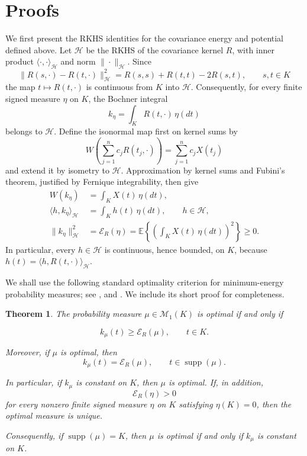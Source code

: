 \documentclass[11pt]{amsart}
\newtheorem{theorem}{Theorem}[section]
\theoremstyle{definition}
\theoremstyle{remark}
\providecommand{\supp}{\operatorname{supp}}
\newcommand{\Ee}{\mathbb E}
\newcommand{\cH}{\mathcal H}
\newcommand{\cM}{\mathcal M_1}
\begin{document}
\section{Proofs}
\label{sec:proofs}
We first present the RKHS identities for the covariance energy and
potential defined above.  Let $\cH$ be the RKHS of the covariance kernel
$R$, with inner product $\langle\cdot,\cdot\rangle_{\cH}$ and norm
$\|\cdot\|_{\cH}$.  Since
\[
 \|R(s,\cdot)-R(t,\cdot)\|_{\cH}^2
 =R(s,s)+R(t,t)-2R(s,t), \qquad s,t \in K
\]
the map $t\mapsto R(t,\cdot)$ is continuous from $K$ into $\cH$.
Consequently, for every finite signed measure $\eta$ on $K$, the
Bochner integral
\[
 k_\eta=\int_KR(t,\cdot)\,\eta(dt)
\]
belongs to $\cH$.  Define the isonormal map first on kernel sums by
\[
 W\left(\sum_{j=1}^nc_jR(t_j,\cdot)\right)
 =\sum_{j=1}^nc_jX(t_j)
\]
and extend it by isometry to $\cH$.  Approximation by kernel sums and
Fubini's theorem, justified by Fernique integrability, then give
\begin{equation}
 \begin{split}
 W(k_\eta)&=\int_KX(t)\,\eta(dt),\\
 \langle h,k_\eta\rangle_{\cH}&=\int_Kh(t)\,\eta(dt),\qquad h\in\cH,\\
 \|k_\eta\|_{\cH}^2
 &=\mathcal E_R(\eta)
 =\Ee\left\{\left(\int_KX(t)\,\eta(dt)\right)^2\right\}\geq0.
 \end{split}
 \label{eq:rkhs-measure-identities}
\end{equation}
In particular, every $h\in\cH$ is continuous, hence bounded, on $K$,
because $h(t)=\langle h,R(t,\cdot)\rangle_{\cH}$.

We shall use the following standard optimality criterion for minimum-energy
probability measures; see   \cite[Theorem~4.3]{adler2014existence}, \cite[Theorem~2.1]{selk2024large} and
\cite[Theorem~1.1]{pronzato2021minimum}.  We include its short proof for
completeness.

\begin{theorem}
\label{thm:optimal-measure-criterion} The probability measure
\(\mu\in\cM(K)\) is optimal
if and only if

\[
        k_\mu(t)\ge \mathcal E_R(\mu),
        \qquad t\in K.
\]

Moreover, if \(\mu\) is optimal, then
\[
        k_\mu(t)=\mathcal E_R(\mu),
        \qquad t\in\supp(\mu).
\]

In particular, if \(k_\mu\) is constant on \(K\), then \(\mu\) is
optimal. If, in addition,
\[
        \mathcal E_R(\eta)>0
\]
for every nonzero finite signed measure \(\eta\) on \(K\) satisfying
\(\eta(K)=0\), then the optimal measure is unique.

Consequently, if \(\supp(\mu)=K\), then \(\mu\) is optimal if and only if
\(k_\mu\) is constant on \(K\).
\end{theorem}
\end{document}
